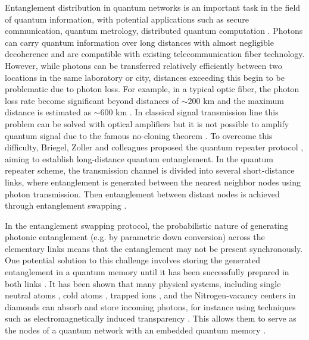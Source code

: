 \documentclass{WileyMSP-template}
\begin{document}
Entanglement distribution in quantum networks is an important task in the field of quantum information, with potential applications such as secure communication, quantum metrology, distributed quantum computation \cite{Wei2022,Wehner2018,Azuma2023}. Photons can carry quantum information over long distances with almost negligible decoherence\cite{berera20,berera21} and are compatible with existing telecommunication fiber technology.
However, while photons can be transferred relatively efficiently between two locations in the same laboratory or city, distances exceeding this begin to be problematic due to photon loss.
For example, in a typical optic fiber, the photon loss rate become significant beyond distances of $ \sim 200 $ km and the maximum distance is estimated as $\sim 600$ km \cite{Pirandola2017, Yingqiu2021}.
In classical signal transmission line this problem can be solved with optical amplifiers but it is not possible to amplify quantum signal due to the famous no-cloning theorem \cite{Park1970, Wootters1982, Nielsen2010}. To overcome this difficulty, Briegel, Zoller and colleagues proposed the quantum repeater protocol \cite{Briegel1998},
aiming to establish long-distance quantum entanglement.
In the quantum repeater scheme, the transmission channel is divided into several short-distance links, where entanglement is generated between the nearest neighbor nodes using photon transmission.  Then entanglement between distant nodes is achieved through entanglement swapping \cite{bennett1993teleporting,zukowski1993event,Pan1998}.

In the entanglement swapping protocol, the probabilistic nature of generating photonic entanglement (e.g. by parametric down conversion) across the elementary links means that the entanglement may not be present synchronously.  One potential solution to this challenge involves storing the generated entanglement in a quantum memory until it has been successfully prepared in both links \cite{Lvovsky2009, Simon2010, Heshami2016}. It has been shown that many physical systems, including single neutral atoms \cite{Reiserer2015,Rosenfeld2008},
cold atoms \cite{Sangouard2011},
trapped ions \cite{Duan2010},
and the Nitrogen-vacancy centers in diamonds \cite{Childress2006, Gurudev2007,hermans2022qubit}
can absorb and store incoming photons,
for instance using techniques such as electromagnetically induced transparency \cite{Fleischhauer2005}.  This allows them to serve as the nodes of a quantum network with an embedded quantum memory \cite{Duan2001,Duan2010,Ritter2012}.
\end{document}
